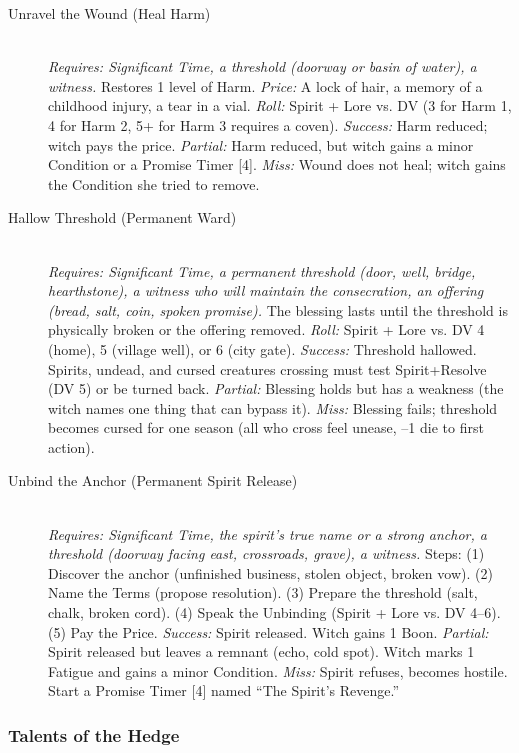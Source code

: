 \begin{description}
    \item[Unravel the Wound (Heal Harm)] \hfill \\
    \textit{Requires: Significant Time, a threshold (doorway or basin of water), a witness.} Restores 1 level of Harm. \textit{Price:} A lock of hair, a memory of a childhood injury, a tear in a vial. \textit{Roll:} Spirit + Lore vs. DV (3 for Harm 1, 4 for Harm 2, 5+ for Harm 3 requires a coven). \textit{Success:} Harm reduced; witch pays the price. \textit{Partial:} Harm reduced, but witch gains a minor Condition or a Promise Timer [4]. \textit{Miss:} Wound does not heal; witch gains the Condition she tried to remove.

    \item[Hallow Threshold (Permanent Ward)] \hfill \\
    \textit{Requires: Significant Time, a permanent threshold (door, well, bridge, hearthstone), a witness who will maintain the consecration, an offering (bread, salt, coin, spoken promise).} The blessing lasts until the threshold is physically broken or the offering removed. \textit{Roll:} Spirit + Lore vs. DV 4 (home), 5 (village well), or 6 (city gate). \textit{Success:} Threshold hallowed. Spirits, undead, and cursed creatures crossing must test Spirit+Resolve (DV 5) or be turned back. \textit{Partial:} Blessing holds but has a weakness (the witch names one thing that can bypass it). \textit{Miss:} Blessing fails; threshold becomes cursed for one season (all who cross feel unease, --1 die to first action).

    \item[Unbind the Anchor (Permanent Spirit Release)] \hfill \\
    \textit{Requires: Significant Time, the spirit's true name or a strong anchor, a threshold (doorway facing east, crossroads, grave), a witness.} Steps: (1) Discover the anchor (unfinished business, stolen object, broken vow). (2) Name the Terms (propose resolution). (3) Prepare the threshold (salt, chalk, broken cord). (4) Speak the Unbinding (Spirit + Lore vs. DV 4--6). (5) Pay the Price. \textit{Success:} Spirit released. Witch gains 1 Boon. \textit{Partial:} Spirit released but leaves a remnant (echo, cold spot). Witch marks 1 Fatigue and gains a minor Condition. \textit{Miss:} Spirit refuses, becomes hostile. Start a Promise Timer [4] named ``The Spirit's Revenge.''
\end{description}

\subsubsection{Talents of the Hedge}

